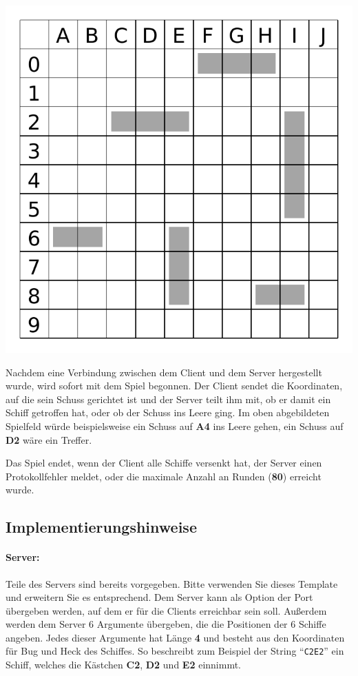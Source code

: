 {\centering
\includegraphics[scale=0.55]{map.pdf} \par
}

Nachdem eine Verbindung zwischen dem Client und dem Server hergestellt wurde,
wird sofort mit dem Spiel begonnen.
Der Client sendet die Koordinaten, auf die sein Schuss gerichtet ist
und der Server teilt ihm mit, ob er damit ein Schiff getroffen hat,
oder ob der Schuss ins Leere ging.
Im oben abgebildeten Spielfeld würde beispielsweise ein Schuss auf \textbf{A4} ins Leere gehen,
ein Schuss auf \textbf{D2} wäre ein Treffer.

Das Spiel endet, wenn der Client alle Schiffe versenkt hat, der Server einen
Protokollfehler meldet, oder die maximale Anzahl an Runden (\textbf{80})
erreicht wurde.

\subsection*{Implementierungshinweise}
\label{sec:implhints}
\paragraph{Server:}
Teile des Servers sind bereits vorgegeben. Bitte verwenden Sie dieses Template
und erweitern Sie es entsprechend.  Dem Server kann als Option der Port
übergeben werden, auf dem er für die Clients erreichbar sein soll.
Außerdem werden dem Server 6 Argumente übergeben, die die Positionen der 6 Schiffe angeben.
Jedes dieser Argumente hat Länge \textbf{4} und besteht aus den Koordinaten
für Bug und Heck des Schiffes. So beschreibt zum Beispiel der String ``\verb|C2E2|''
ein Schiff, welches die Kästchen \textbf{C2}, \textbf{D2} und \textbf{E2} einnimmt.

